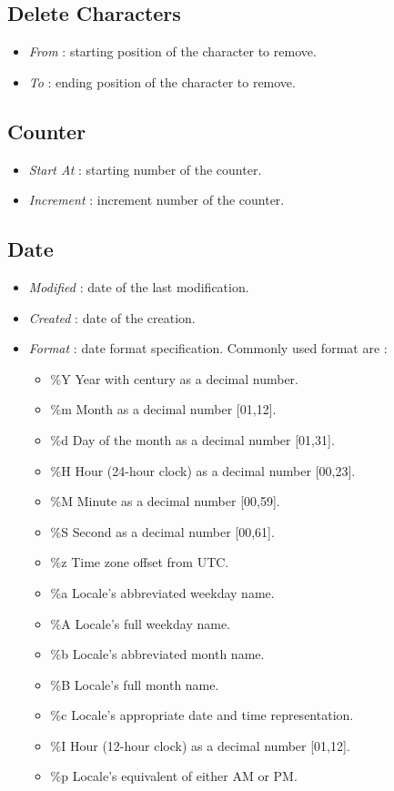 \documentclass[12pt, a4paper]{scrartcl}
\begin{document}
\subsection{Delete Characters}
\begin{itemize}
    \item \emph{From} : starting position of the character to remove.
    \item \emph{To} : ending position of the character to remove.
\end{itemize}
\subsection{Counter}
\begin{itemize}
    \item \emph{Start At} : starting number of the counter. 
    \item \emph{Increment} : increment number of the counter.
\end{itemize}
\subsection{Date}
\begin{itemize}
    \item \emph{Modified} : date of the last modification.
    \item \emph{Created} : date of the creation.
    \item \emph{Format} : date format specification. Commonly used format are :
        \begin{itemize} 
            \item  \%Y  Year with century as a decimal number.
            \item  \%m  Month as a decimal number [01,12].
            \item  \%d  Day of the month as a decimal number [01,31].
            \item  \%H  Hour (24-hour clock) as a decimal number [00,23].
            \item  \%M  Minute as a decimal number [00,59].
            \item  \%S  Second as a decimal number [00,61].
            \item  \%z  Time zone offset from UTC.
            \item  \%a  Locale's abbreviated weekday name.
            \item  \%A  Locale's full weekday name.
            \item  \%b  Locale's abbreviated month name.
            \item  \%B  Locale's full month name.
            \item  \%c  Locale's appropriate date and time representation.
            \item  \%I  Hour (12-hour clock) as a decimal number [01,12].
            \item  \%p  Locale's equivalent of either AM or PM.
        \end{itemize}
\end{itemize}
\end{document}
